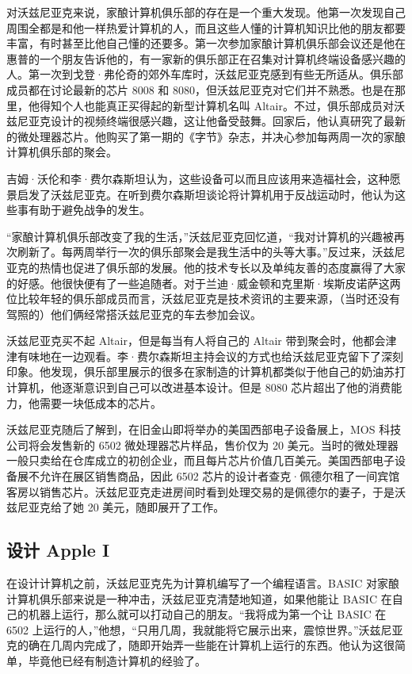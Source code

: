 \documentclass[12pt,UTF8]{ctexbook}
\begin{document}
对沃兹尼亚克来说，家酿计算机俱乐部的存在是一个重大发现。他第一次发现自己周围全都是和他一样热爱计算机的人，而且这些人懂的计算机知识比他的朋友都要丰富，有时甚至比他自己懂的还要多。第一次参加家酿计算机俱乐部会议还是他在惠普的一个朋友告诉他的，有一家新的俱乐部正在召集对计算机终端设备感兴趣的人。第一次到戈登·弗伦奇的郊外车库时，沃兹尼亚克感到有些无所适从。俱乐部成员都在讨论最新的芯片 8008 和 8080，但沃兹尼亚克对它们并不熟悉。也是在那里，他得知个人也能真正买得起的新型计算机名叫 Altair。不过，俱乐部成员对沃兹尼亚克设计的视频终端很感兴趣，这让他备受鼓舞。回家后，他认真研究了最新的微处理器芯片。他购买了第一期的《字节》杂志，并决心参加每两周一次的家酿计算机俱乐部的聚会。

吉姆·沃伦和李·费尔森斯坦认为，这些设备可以而且应该用来造福社会，这种愿景启发了沃兹尼亚克。在听到费尔森斯坦谈论将计算机用于反战运动时，他认为这些事有助于避免战争的发生。

“家酿计算机俱乐部改变了我的生活，”沃兹尼亚克回忆道，“我对计算机的兴趣被再次刷新了。每两周举行一次的俱乐部聚会是我生活中的头等大事。”反过来，沃兹尼亚克的热情也促进了俱乐部的发展。他的技术专长以及单纯友善的态度赢得了大家的好感。他很快便有了一些追随者。对于兰迪·威金顿和克里斯·埃斯皮诺萨这两位比较年轻的俱乐部成员而言，沃兹尼亚克是技术资讯的主要来源，（当时还没有驾照的）他们俩经常搭沃兹尼亚克的车去参加会议。

沃兹尼亚克买不起 Altair，但是每当有人将自己的 Altair 带到聚会时，他都会津津有味地在一边观看。李·费尔森斯坦主持会议的方式也给沃兹尼亚克留下了深刻印象。他发现，俱乐部里展示的很多在家制造的计算机都类似于他自己的奶油苏打计算机，他逐渐意识到自己可以改进基本设计。但是 8080 芯片超出了他的消费能力，他需要一块低成本的芯片。

沃兹尼亚克随后了解到，在旧金山即将举办的美国西部电子设备展上，MOS 科技公司将会发售新的 6502 微处理器芯片样品，售价仅为 20 美元。当时的微处理器一般只卖给在仓库成立的初创企业，而且每片芯片价值几百美元。美国西部电子设备展不允许在展区销售商品，因此 6502 芯片的设计者查克·佩德尔租了一间宾馆客房以销售芯片。沃兹尼亚克走进房间时看到处理交易的是佩德尔的妻子，于是沃兹尼亚克给了她 20 美元，随即展开了工作。





\subsection{设计 Apple I}


在设计计算机之前，沃兹尼亚克先为计算机编写了一个编程语言。BASIC 对家酿计算机俱乐部来说是一种冲击，沃兹尼亚克清楚地知道，如果他能让 BASIC 在自己的机器上运行，那么就可以打动自己的朋友。“我将成为第一个让 BASIC 在 6502 上运行的人，”他想，“只用几周，我就能将它展示出来，震惊世界。”沃兹尼亚克的确在几周内完成了，随即开始弄一些能在计算机上运行的东西。他认为这很简单，毕竟他已经有制造计算机的经验了。
\end{document}
